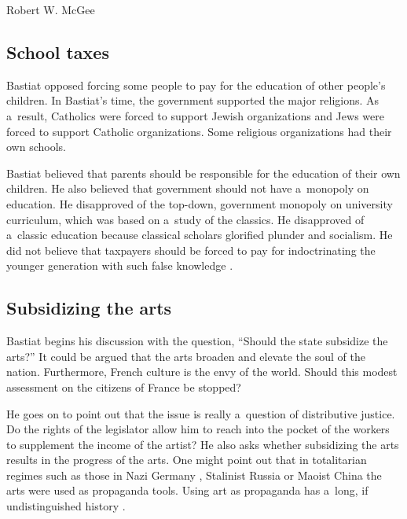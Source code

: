 \begin{artengenv}{Robert W. McGee}
\subsection{School taxes}



Bastiat opposed forcing some people to pay for the education of other people's children. In Bastiat's time, the government supported the major religions. As a~result, Catholics were forced to support Jewish organizations and Jews were forced to support Catholic organizations. Some religious organizations had their own schools.



Bastiat believed that parents should be responsible for the education of their own children. He also believed that government should not have a~monopoly on education. He disapproved of the top-down, government monopoly on university curriculum, which was based on a~study of the classics. He disapproved of a~classic education because classical scholars glorified plunder and socialism. He did not believe that taxpayers should be forced to pay for indoctrinating the younger generation with such false knowledge 
\parencite[][pp.278–283]{bastiat_selected_1964}.%




\subsection{Subsidizing the arts}



Bastiat begins his discussion with the question, ``Should the state subsidize the arts?'' 
\parencite[][p.11]{bastiat_selected_1964} %
 It could be argued that the arts broaden and elevate the soul of the nation. Furthermore, French culture is the envy of the world. Should this modest assessment on the citizens of France be stopped?



He goes on to point out that the issue is really a~question of distributive justice. Do the rights of the legislator allow him to reach into the pocket of the workers to supplement the income of the artist? He also asks whether subsidizing the arts results in the progress of the arts. One might point out that in totalitarian regimes such as those in Nazi Germany 
\parencite[][]{furstenau_how_2020}, %
 Stalinist Russia 
\parencite[][]{beale_history_2019} %
 or Maoist China 
\parencite[][]{burgess_art_2018} %
 the arts were used as propaganda tools. Using art as propaganda has a~long, if undistinguished history 
\parencites[][]{levy_art_2017}[][]{weissman_how_2023}.%





\end{artengenv}
